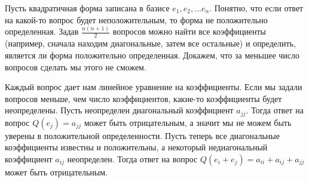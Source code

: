 \documentclass{article}
\begin{document}
Пусть квадратичная форма записана в базисе $e_1, e_2, \ldots e_n$. Понятно, что если ответ на какой-то вопрос будет неположительным, то форма не положительно определенная. 
Задав $\frac{n(n+1)}{2}$ вопросов можно найти все коэффициенты (например, сначала находим диагональные, затем все остальные) и определить, является ли форма положительно определенная. Докажем, что 
за меньшее число вопросов сделать мы этого не сможем.

Каждый вопрос дает нам линейное уравнение на коэффициенты. Если мы задали вопросов меньше, чем число коэффициентов, какие-то 
коэффициенты будет неопределены. Пусть неопределен диагональный коэффициент $a_{jj}$. Тогда ответ на вопрос $Q(e_{j}) = a_{jj}$ может 
быть отрицательным, а значит мы не можем быть уверены в положительной определенности. Пусть теперь все диагональные коэффициенты известны и положительны, а 
некоторый недиагональный коэффициент $a_{ij}$ неопределен. Тогда ответ на вопрос $Q(e_i + e_j) = a_{ii} + a_{ij} + a_{jj}$ может быть отрицательным.
\end{document}
